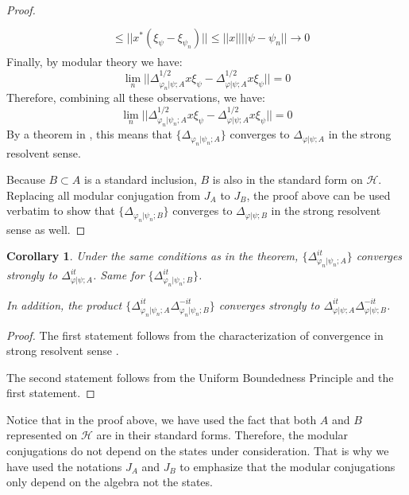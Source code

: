 \documentclass[a4paper,11pt]{article}
\newtheorem{corollary}[theorem]{Corollary}
\theoremstyle{definition}
\begin{document}
\begin{proof}
\begin{align}
\begin{split}
            \\&
            \leq ||x^*(\xi_\psi - \xi_{\psi_n})|| \leq ||x||||\psi - \psi_n||\rightarrow 0
        \end{split}
    \end{align}
    Finally, by modular theory we have:
    \begin{equation}
        \lim_n||\Delta^{1/2}_{\varphi_n|\psi;A}x\xi_\psi - \Delta^{1/2}_{\varphi|\psi;A}x\xi_\psi|| = 0
    \end{equation}
    Therefore, combining all these observations, we have:
    \begin{equation}
        \lim_n||\Delta^{1/2}_{\varphi_n|\psi_n;A}x\xi_\psi - \Delta^{1/2}_{\varphi|\psi;A}x\xi_\psi|| = 0
    \end{equation}
    By a theorem in \cite{takesaki2}, this means that $\{\Delta_{\varphi_n|\psi_n;A}\}$ converges to $\Delta_{\varphi|\psi;A}$ in the strong resolvent sense. 

    Because $B\subset A$ is a standard inclusion, $B$ is also in the standard form on $\mathcal{H}$. Replacing all modular conjugation from $J_A$ to $J_B$, the proof above can be used verbatim to show that $\{\Delta_{\varphi_n|\psi_n;B}\}$ converges to $\Delta_{\varphi|\psi;B}$ in the strong resolvent sense as well.
\end{proof}
\begin{corollary}
    Under the same conditions as in the theorem, $\{\Delta^{it}_{\varphi_n|\psi_n;A}\}$ converges strongly to $\Delta^{it}_{\varphi|\psi;A}$. Same for $\{\Delta^{it}_{\varphi_n|\psi_n;B}\}$.

    In addition, the product $\{\Delta^{it}_{\varphi_n|\psi_n;A}\Delta^{-it}_{\varphi_n|\psi_n;B}\}$ converges strongly to $\Delta^{it}_{\varphi|\psi;A}\Delta^{-it}_{\varphi|\psi;B}$.
\end{corollary}
\begin{proof}
    The first statement follows from the characterization of convergence in strong resolvent sense \cite{takesaki2}.

    The second statement follows from the Uniform Boundedness Principle and the first statement.
\end{proof}
Notice that in the proof above, we have used the fact that both $A$ and $B$ represented on $\mathcal{H}$ are in their standard forms. Therefore, the modular conjugations do not depend on the states under consideration. That is why we have used the notations $J_A$ and $J_B$ to emphasize that the modular conjugations only depend on the algebra not the states.
\end{document}
